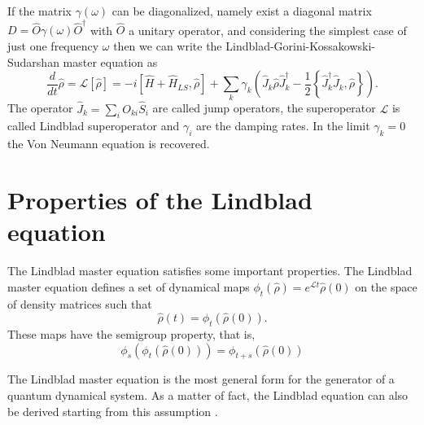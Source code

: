 If the matrix $\gamma(\omega)$ can be diagonalized, namely exist a diagonal matrix $D=\hat O \gamma(\omega) \hat O^\dagger$ with $\hat O$ a unitary operator, and considering the simplest case of just one frequency $\omega$ then we can write the Lindblad-Gorini-Kossakowski-Sudarshan master equation as
\begin{equation}\label{Lindbladian}
    \frac{d}{dt}\hat\rho =\mathcal{L}\left[\hat\rho\right] = -i\left[\hat H+\hat H_{LS},\hat\rho\right] + \sum_k \gamma_k \left(\hat J_k \hat\rho \hat J^\dagger_k - \frac{1}{2}\left\{ \hat J^\dagger_k\hat J_k, \hat\rho\right\} \right).
\end{equation}
The operator $\hat J_k= \sum_i O_{ki} \hat S_{i}$ are called jump operators, the superoperator $\mathcal{L}$ is called Lindblad superoperator and $\gamma_i$ are the damping rates. In the limit $\gamma_k = 0$ the Von Neumann equation is recovered.



\section{Properties of the Lindblad equation}
The Lindblad master equation satisfies some important properties.
The Lindblad master equation defines a set of dynamical maps $\phi_t\left(\hat\rho\right)= e^{\mathcal{L}t}\hat\rho(0)$ on the space of density matrices such that
\begin{equation}
    \hat\rho(t) = \phi_t\left(\hat\rho(0)\right).
\end{equation}
These maps have the semigroup property, that is,
\begin{equation}
    \phi_s\left(\phi_t\left(\hat\rho(0)\right)\right)=\phi_{t+s}\left(\hat\rho(0)\right)
\end{equation}

The Lindblad master equation is the most general form for the generator of a quantum dynamical system. As a matter of fact, the Lindblad equation can also be derived starting from this assumption \cite{Breuer-Petruccione}.

